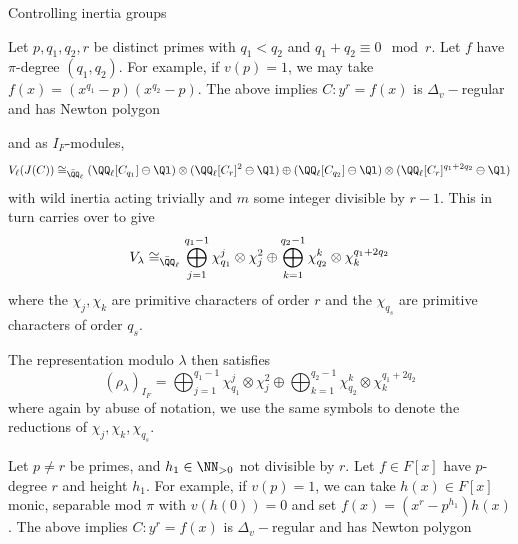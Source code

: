 \documentclass[11pt,a4paper]{article}
\newcommand{\Dv}{\Delta_v}
\begin{document}
\begin{section}{Controlling inertia groups}
\begin{example}
\label{example_Golbach}
Let $p,q_1,q_2,r$ be distinct primes with $q_1 < q_2$ and $q_1+q_2 \equiv 0 \mod{r}$. Let $f$ have $\pi$-degree $(q_1,q_2)$. For example, if $v(p)=1$, we may take $f(x) = (x^{q_1}-p)(x^{q_2}-p)$. The above implies $C\colon y^r=f(x)$ is $\Dv-$regular and has Newton polygon
\begin{center}
\end{center}
and as $I_F$-modules, \[V_\ell(J(C)) \cong_{\Bar{\QQ}_\ell} (\QQ_\ell[C_{q_1}] \ominus \Ql)\otimes (\QQ_\ell[C_{r}]^{2} \ominus \Ql) \oplus (\QQ_\ell[C_{q_2}] \ominus \Ql)\otimes (\QQ_\ell[C_{r}]^{q_1+2q_2} \ominus \Ql)\]
with wild inertia acting trivially and $m$ some integer divisible by $r-1$. This in turn carries over to give
\[V_\lambda \cong_{\Bar{\QQ}_\ell}  \bigoplus_{j=1}^{q_1-1} \chi_{q_1}^{j} \otimes \chi_j^2 \oplus \bigoplus_{k=1}^{q_2-1} \chi_{q_2}^{k} \otimes \chi_k^{q_1+2q_2}\]
where the $\chi_j, \chi_k$ are primitive characters of order $r$ and the $\chi_{q_s}$ are primitive characters of order $q_s$.

The representation modulo $\lambda$ then satisfies
\[ (\rho_\lambda)_{I_F} =  \bigoplus_{j=1}^{q_1-1} \chi_{q_1}^{j} \otimes \chi_j^2 \oplus \bigoplus_{k=1}^{q_2-1} \chi_{q_2}^{k} \otimes \chi_k^{q_1 + 2q_2}
\]
where again by abuse of notation, we use the same symbols to denote the reductions of $\chi_{j},\chi_k, \chi_{q_s}$.
\end{example}

\begin{example}
\label{example_transvection}
Let $p \neq r$ be primes, and $h_1 \in \NN_{>0}$ not divisible by $r$. Let $f \in F[x]$ have $p$-degree $r$ and height $h_1$. For example, if $v(p)=1$, we can take $h(x) \in F[x]$ monic, separable mod $\pi$ with $v(h(0))=0$ and set $f(x) = (x^r-p^{h_1})h(x)$. The above implies $C\colon y^r=f(x)$ is $\Dv-$regular and has Newton polygon
\begin{center}
\end{center}
\end{example}
\end{section}
\end{document}

